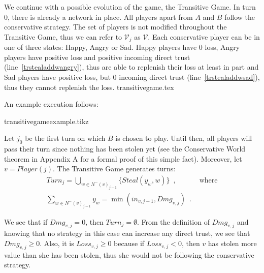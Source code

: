   We continue with a possible evolution of the game, the Transitive Game. In turn 0, there is already a network in place. All
  players apart from $A$ and $B$ follow the conservative strategy. The set of players is not modified throughout the
  Transitive Game, thus we can refer to $\mathcal{V}_j$ as $\mathcal{V}$. Each conservative player can be in one of three
  states: Happy, Angry or Sad. Happy players have 0 loss, Angry players have positive loss and positive incoming direct trust
  (line~\ref{trstealaddwangry}), thus are able to replenish their loss at least in part and Sad players have positive loss,
  but 0 incoming direct trust (line~\ref{trstealaddwsad}), thus they cannot replenish the loss.
  {transitivegame.tex}

  \noindent An example execution follows:

  {transitivegameexample.tikz}

  \noindent Let $j_0$ be the first turn on which $B$ is chosen to play. Until then, all players will pass their turn since
  nothing has been stolen yet (see the Conservative World theorem in Appendix A \cite{trustisrisk} for a formal proof of this
  simple fact).  Moreover, let $v = Player(j)$. The Transitive Game generates turns:
  \begin{align}
     Turn_j = \bigcup\limits_{w \in N^{-}\left(v\right)_{j-1}}\{Steal\left(y_w,w\right)\} \enspace, & \mbox{ where} \\
     \sum\limits_{w \in N^{-}\left(v\right)_{j-1}}y_w = \min\left(in_{v, j-1}, Dmg_{v, j}\right) \enspace. &
  \end{align}
 
  \noindent We see that if $Dmg_{v, j} = 0$, then $Turn_j = \emptyset$. From the definition of $Dmg_{v,j}$ and knowing that no
  strategy in this case can increase any direct trust, we see that $Dmg_{v,j} \geq 0$. Also, it is $Loss_{v,j} \geq 0$ because
  if $Loss_{v,j} < 0$, then $v$ has stolen more value than she has been stolen, thus she would not be following the
  conservative strategy.
